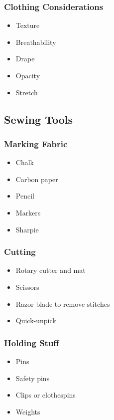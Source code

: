 \documentclass{beamer}
\begin{document}
\begin{frame}[fragile]
\frametitle{Clothing Considerations}
\begin{itemize}
\item Texture
\item Breathability
\item Drape
\item Opacity
\item Stretch
\end{itemize}
\end{frame}

\subsection{Sewing Tools}

\begin{frame}[fragile]
\tableofcontents[currentsubsection]
\end{frame}


\begin{frame}[fragile]
\frametitle{Marking Fabric}
\begin{itemize}
\item Chalk
\item Carbon paper
\item Pencil
\item Markers
\item Sharpie
\end{itemize}
\end{frame}

\begin{frame}[fragile]
\frametitle{Cutting}
\begin{itemize}
\item Rotary cutter and mat
\item Scissors
\item Razor blade to remove stitches
\item Quick-unpick
\end{itemize}
\end{frame}

\begin{frame}[fragile]
\frametitle{Holding Stuff}
\begin{itemize}
\item Pins
\item Safety pins
\item Clips or clothespins
\item Weights
\end{itemize}
\end{frame}
\end{document}
